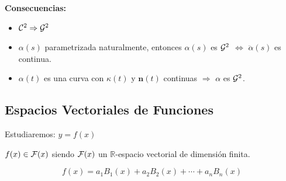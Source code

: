 \documentclass[twoside]{report}
\begin{document}
{\bf Consecuencias:}
\begin{itemize}
\item ${\cal C}^2 \Rightarrow {\cal G}^2$
\item $\alpha(s)$ parametrizada naturalmente, entonces $\alpha(s)$ es ${\cal G}^2$ $\Leftrightarrow$  $\ddot{\alpha}(s)$ es continua.
\item $\alpha(t)$ es una curva con $\kappa(t)$ y $\mathbf{n}(t)$ continuas $\Rightarrow$ $\alpha$ es ${\cal G}^2$.

\end{itemize}

\subsection{Espacios Vectoriales de Funciones}

Estudiaremos: $y=f(x)$

\vspace{0.5cm}

$f(x)\in {\cal F}(x)$ siendo ${\cal F}(x)$ un $\mathbb{R}$-espacio vectorial de dimensión finita.

$$f(x)=a_1 B_1(x)+a_2 B_2(x)+\cdots+a_n B_n(x)$$

%
%
%
%
%
%
%
%
\end{document}
